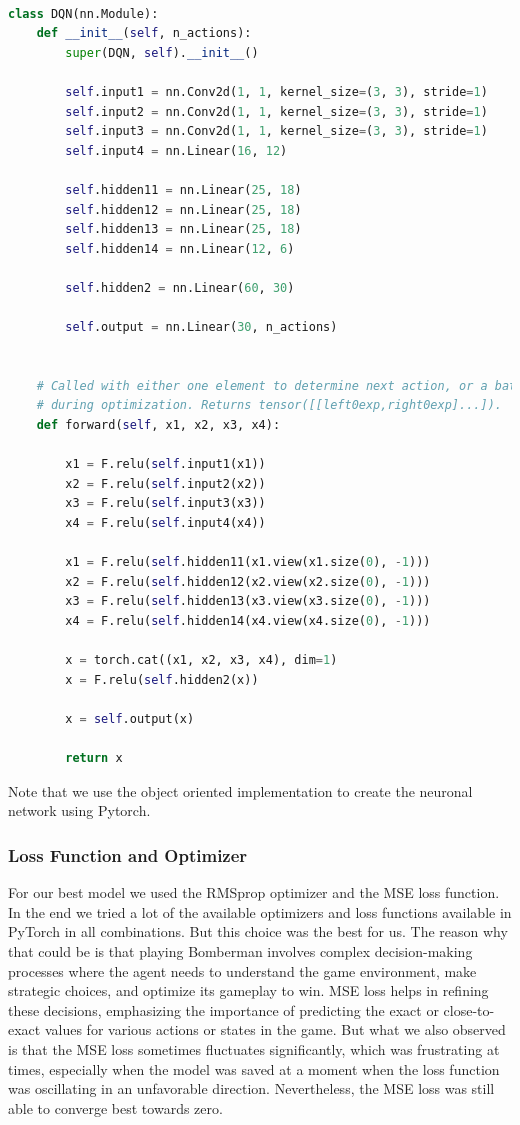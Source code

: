 \begin{lstlisting}[language=Python]

class DQN(nn.Module):
    def __init__(self, n_actions):
        super(DQN, self).__init__()

        self.input1 = nn.Conv2d(1, 1, kernel_size=(3, 3), stride=1)
        self.input2 = nn.Conv2d(1, 1, kernel_size=(3, 3), stride=1)
        self.input3 = nn.Conv2d(1, 1, kernel_size=(3, 3), stride=1)
        self.input4 = nn.Linear(16, 12)

        self.hidden11 = nn.Linear(25, 18)
        self.hidden12 = nn.Linear(25, 18)
        self.hidden13 = nn.Linear(25, 18)
        self.hidden14 = nn.Linear(12, 6)

        self.hidden2 = nn.Linear(60, 30)

        self.output = nn.Linear(30, n_actions)


    # Called with either one element to determine next action, or a batch
    # during optimization. Returns tensor([[left0exp,right0exp]...]).
    def forward(self, x1, x2, x3, x4):

        x1 = F.relu(self.input1(x1))
        x2 = F.relu(self.input2(x2))
        x3 = F.relu(self.input3(x3))
        x4 = F.relu(self.input4(x4))

        x1 = F.relu(self.hidden11(x1.view(x1.size(0), -1)))
        x2 = F.relu(self.hidden12(x2.view(x2.size(0), -1)))
        x3 = F.relu(self.hidden13(x3.view(x3.size(0), -1)))
        x4 = F.relu(self.hidden14(x4.view(x4.size(0), -1)))

        x = torch.cat((x1, x2, x3, x4), dim=1)
        x = F.relu(self.hidden2(x))

        x = self.output(x)

        return x

\end{lstlisting}

\noindent Note that we use the object oriented implementation to create the neuronal network 
using Pytorch.

\subsubsection{Loss Function and Optimizer}

For our best model we used the RMSprop optimizer and the MSE loss function. In the end 
we tried a lot of the available optimizers and loss functions available in PyTorch 
in all combinations. But this choice was the best for us. The reason why that could be is
that playing Bomberman involves complex decision-making processes where the agent needs to understand the game environment, 
make strategic choices, and optimize its gameplay to win. MSE loss helps in refining these decisions, emphasizing the importance of predicting the 
exact or close-to-exact values for various actions or states in the game. But what we also observed is that the MSE loss sometimes 
fluctuates significantly, which was frustrating at times, especially when the model was saved at a moment when the loss function was oscillating 
in an unfavorable direction. Nevertheless, the MSE loss was still able to converge best towards zero.\\

